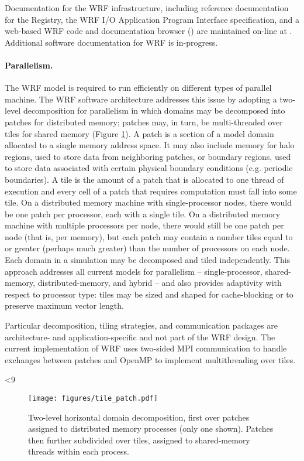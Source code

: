 Documentation for the WRF infrastructure, including reference
documentation for the Registry, the WRF I/O Application Program
Interface specification, and a web-based WRF code and documentation
browser (\citet{fiedler}) are maintained on-line at \citep{sasi}.
Additional software documentation for WRF is in-progress.


\paragraph{Parallelism.}
\label{asf_patch}
The WRF model is required to run efficiently on different types of
parallel machine. The WRF software architecture
addresses this issue by adopting a two-level decomposition for
parallelism in which domains may be decomposed into patches for
distributed memory; patches may, in turn, be multi-threaded over tiles
for shared memory (Figure \ref{figure:decomposition}). A patch is a
section of a model domain allocated to a single memory address space.
It may also include memory for halo regions, used to store data from
neighboring patches, or boundary regions, used to store data associated
with certain physical boundary conditions (e.g. periodic boundaries).
A tile is the amount of a patch that is allocated to one thread of
execution and every cell of a patch that requires computation must fall
into some tile. On a distributed memory machine with single-processor
nodes, there would be one patch per processor, each with a single tile.
On a distributed memory machine with multiple processors per node,
there would still be one patch per node (that is, per memory), but each
patch may contain a number tiles equal to or greater (perhaps much
greater) than the number of processors on each node.  Each domain in a
simulation may be decomposed and tiled independently.  This approach
addresses all current models for parallelism -- single-processor,
shared-memory, distributed-memory, and hybrid -- and also provides
adaptivity with respect to processor type: tiles may be sized and
shaped for cache-blocking or to preserve maximum vector length.

Particular decomposition, tiling strategies, and communication packages
are architecture- and application-specific and not part of the
WRF design.  The current implementation of WRF
uses two-sided MPI communication to handle exchanges between
patches and OpenMP to implement multithreading over tiles.

%
%
\ifnum{}<9
\begin{figure}
  \centering
  \texttt{[image: figures/tile\_patch.pdf]}
  \caption{\label{figure:decomposition}Two-level horizontal domain decomposition, first over patches assigned to
distributed memory processes (only one shown). Patches then further subdivided over tiles, assigned to shared-memory threads
within each process.}
\end{figure}
\fi

